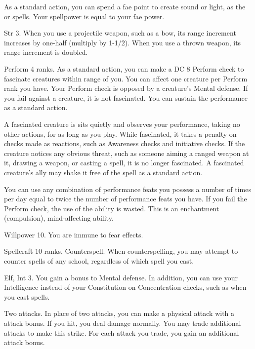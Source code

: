 As a standard action, you can spend a fae point to create sound or light, as the  or  spells.
Your spellpower is equal to your fae power.

\featpre Str 3.
\featben When you use a projectile weapon, such as a bow, its range increment increases by one-half (multiply by 1-1/2).
When you use a thrown weapon, its range increment is doubled.

\featpre Perform 4 ranks.
\featben As a standard action, you can make a DC 8 Perform check to fascinate creatures within \rngmed range of you.
You can affect one creature per Perform rank you have.
Your Perform check is opposed by a creature's Mental defense.
If you fail against a creature, it is not fascinated.
You can sustain the performance as a standard action.

A fascinated creature is sits quietly and observes your performance, taking no other actions, for as long as you play.
While fascinated, it takes a  penalty on checks made as reactions, such as Awareness checks and initiative checks.
If the creature notices any obvious threat, such as someone aiming a ranged weapon at it, drawing a weapon, or casting a spell, it is no longer fascinated.
A fascinated creature's ally may shake it free of the spell as a standard action.

You can use any combination of performance feats you possess a number of times per day equal to twice the number of performance feats you have.
If you fail the Perform check, the use of the ability is wasted.
This is an enchantment (compulsion), mind-affecting ability.

\featpre Willpower 10.
\featben You are immune to fear effects.

\featpres Spellcraft 10 ranks, Counterspell.
\featben When counterspelling, you may attempt to counter spells of any school, regardless of which spell you cast.

\featpre Elf, Int 3.
\featben You gain a  bonus to Mental defense.
In addition, you can use your Intelligence instead of your Constitution on Concentration checks, such as when you cast spells.

\featpre Two attacks.
\featben In place of two attacks, you can make a physical attack with a  attack bonus.
If you hit, you deal damage normally.
You may trade additional attacks to make this strike.
For each attack you trade, you gain an additional  attack bonus.

